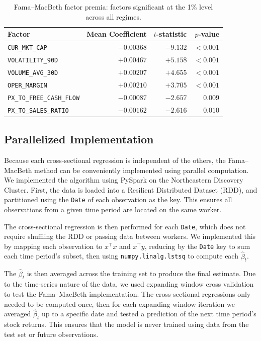 \documentclass[11pt]{article}
\begin{document}
\begin{table}[H]
\centering
\caption{Fama--MacBeth factor premia: factors significant at the 1\% level across all regimes.}
\label{tab:factor_premia}
\begin{tabular}{lrrr}
\toprule
Factor & Mean Coefficient & $t$-statistic & $p$-value \\
\midrule
\verb|CUR_MKT_CAP|       & $-0.00368$ & $-9.132$ & $<0.001$ \\
\verb|VOLATILITY_90D|     & $+0.00467$ & $+5.158$ & $<0.001$ \\
\verb|VOLUME_AVG_30D|     & $+0.00207$ & $+4.655$ & $<0.001$ \\
\verb|OPER_MARGIN|        & $+0.00210$ & $+3.705$ & $<0.001$ \\
\verb|PX_TO_FREE_CASH_FLOW| & $-0.00087$ & $-2.657$ & $0.009$ \\
\verb|PX_TO_SALES_RATIO|  & $-0.00162$ & $-2.616$ & $0.010$ \\
\bottomrule
\end{tabular}
\end{table}

\subsection{Parallelized Implementation}

Because each cross-sectional regression is independent of the others, the Fama--MacBeth method can be conveniently implemented using parallel computation. We implemented the algorithm using PySpark on the Northeastern Discovery Cluster. First, the data is loaded into a Resilient Distributed Dataset (RDD), and partitioned using the \verb|Date| of each observation as the key. This ensures all observations from a given time period are located on the same worker.

The cross-sectional regression is then performed for each \verb|Date|, which does not require shuffling the RDD or passing data between workers. We implemented this by mapping each observation to $x^{\intercal}x$ and $x^{\intercal}y$, reducing by the \verb|Date| key to sum each time period's subset, then using \verb|numpy.linalg.lstsq| to compute each $\hat{\beta}_t$.

The $\hat{\beta}_t$ is then averaged across the training set to produce the final estimate. Due to the time-series nature of the data, we used expanding window cross validation to test the Fama--MacBeth implementation. The cross-sectional regressions only needed to be computed once, then for each expanding window iteration we averaged $\hat{\beta}_t$ up to a specific date and tested a prediction of the next time period's stock returns. This ensures that the model is never trained using data from the test set or future observations.
\end{document}
